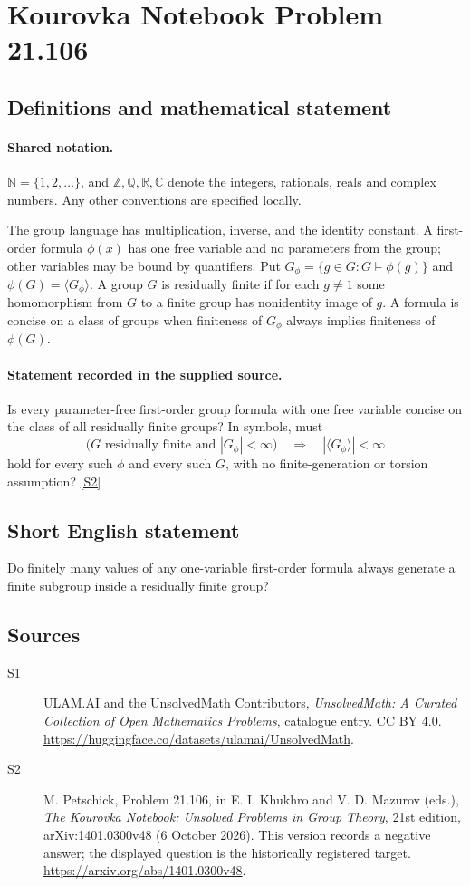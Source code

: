 \documentclass[11pt]{article}
\newcommand{\sref}[2]{\hyperlink{source:#1:#2}{[S#2]}}
\begin{document}
\section{Kourovka Notebook Problem 21.106}\label{statement}

\subsection{Definitions and mathematical statement}

\paragraph{Shared notation.}$\mathbb N=\{1,2,\ldots\}$, and $\mathbb Z,\mathbb Q,\mathbb R,\mathbb C$ denote the integers, rationals, reals and complex numbers. Any other conventions are specified locally.


The group language has multiplication, inverse, and the identity constant. A first-order formula $\phi(x)$ has one free variable and no parameters from the group; other variables may be bound by quantifiers. Put $G_\phi=\{g\in G:G\models\phi(g)\}$ and $\phi(G)=\langle G_\phi\rangle$. A group $G$ is residually finite if for each $g\ne1$ some homomorphism from $G$ to a finite group has nonidentity image of $g$. A formula is concise on a class of groups when finiteness of $G_\phi$ always implies finiteness of $\phi(G)$.
\paragraph{Statement recorded in the supplied source.}
Is every parameter-free first-order group formula with one free variable concise on the class of all residually finite groups? In symbols, must
\[
 \bigl(G\text{ residually finite and }|G_\phi|<\infty\bigr)
 \quad\Longrightarrow\quad|\langle G_\phi\rangle|<\infty
\]
hold for every such $\phi$ and every such $G$, with no finite-generation or torsion assumption? \sref{statement}{2}
\subsection{Short English statement}
Do finitely many values of any one-variable first-order formula always generate a finite subgroup inside a residually finite group?
\subsection{Sources}
\begin{description}
\item[\hypertarget{source:statement:1}{S1}] ULAM.AI and the UnsolvedMath Contributors, \emph{UnsolvedMath: A Curated Collection of Open Mathematics Problems}, catalogue entry. CC BY 4.0. \url{https://huggingface.co/datasets/ulamai/UnsolvedMath}.
\item[\hypertarget{source:statement:2}{S2}] M. Petschick, Problem 21.106, in E. I. Khukhro and V. D. Mazurov (eds.), \emph{The Kourovka Notebook: Unsolved Problems in Group Theory}, 21st edition, arXiv:1401.0300v48 (6 October 2026). This version records a negative answer; the displayed question is the historically registered target. \url{https://arxiv.org/abs/1401.0300v48}.
\end{description}
\label{end:statement}
\end{document}
